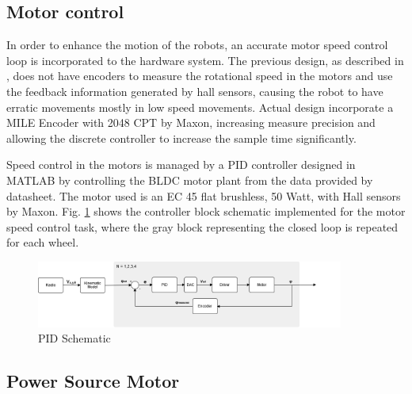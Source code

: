 \documentclass{llncs}
\newcommand{\PR}[1]{{\textcolor{green}{[PR: #1]}}}  %
\begin{document}
\subsection{Motor control} \label{ssec:MotionControl}

In order to enhance the motion of the robots, an accurate motor speed control loop is incorporated to the hardware system. The previous design, as described in \cite{ais2018tdp}, does not have encoders to measure the rotational speed in the motors and use the feedback information generated by hall sensors, causing the robot to have erratic movements mostly in low speed movements. Actual design incorporate a MILE Encoder with 2048 CPT by Maxon, increasing measure precision and allowing the discrete controller to increase the sample time significantly.

Speed control in the motors is managed by a PID controller designed in MATLAB by controlling the BLDC motor plant from the data provided by datasheet. The motor used is an EC 45 flat brushless, 50 Watt, with Hall sensors by Maxon. Fig. \ref{fig:pid_schematic} shows the controller block schematic implemented for the motor speed control task, where the gray block representing the closed loop is repeated for each wheel.

\begin{figure}[h]
    \centering
    \includegraphics[width=0.9\textwidth]{Images/PID_SCHEMATIC.png}
    \caption{PID Schematic}
    \label{fig:pid_schematic}
\end{figure}


\subsection{Power Source Motor}
\end{document}
